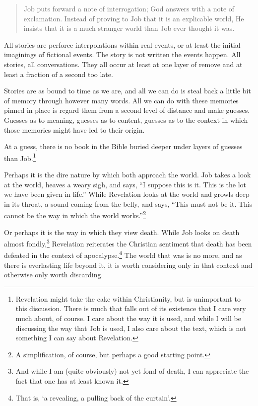 \begin{quote}
Job puts forward a note of interrogation; God answers with a note of exclamation. Instead of proving to Job that it is an explicable world, He insists that it is a much stranger world than Job ever thought it was.

\parencite{intro-to-job}
\end{quote}

All stories are perforce interpolations within real events, or at least the initial imaginings of fictional events. The story is not written the events happen. All stories, all conversations. They all occur at least at one layer of remove and at least a fraction of a second too late.

Stories are as bound to time as we are, and all we can do is steal back a little bit of memory through however many words. All we can do with these memories pinned in place is regard them from a second level of distance and make guesses. Guesses as to meaning, guesses as to content, guesses as to the context in which those memories might have led to their origin.

At a guess, there is no book in the Bible buried deeper under layers of guesses than Job.\footnote{Revelation might take the cake within Christianity, but is unimportant to this discussion. There is much that falls out of its existence that I care very much about, of course. I care about the way it is used, and while I will be discussing the way that Job is used, I also care about the text, which is not something I can say about Revelation.}

Perhaps it is the dire nature by which both approach the world. Job takes a look at the world, heaves a weary sigh, and says, ``I suppose this is it. This is the lot we have been given in life.'' While Revelation looks at the world and growls deep in its throat, a sound coming from the belly, and says, ``This must not be it. This cannot be the way in which the world works.''\footnote{A simplification, of course, but perhaps a good starting point.}

Or perhaps it is the way in which they view death. While Job looks on death almost fondly,\footnote{And while I am (quite obviously) not yet fond of death, I can appreciate the fact that one has at least known it.} Revelation reiterates the Christian sentiment that death has been defeated in the context of apocalypse.\footnote{That is, `a revealing, a pulling back of the curtain'.} The world that was is no more, and as there is everlasting life beyond it, it is worth considering only in that context and otherwise only worth discarding.


